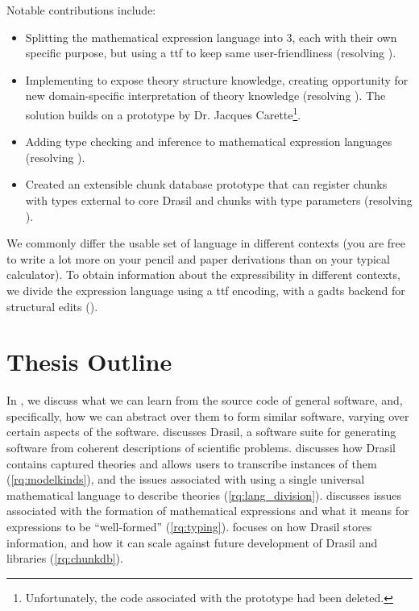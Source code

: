 Notable contributions include:

\begin{itemize}
      
      \item Splitting the mathematical expression language into 3, each with
            their own specific purpose, but using a \acs{ttf} to keep same
            user-friendliness (resolving ).

      \item Implementing \ModelKinds{} to expose theory structure knowledge,
            creating opportunity for new domain-specific interpretation of
            theory knowledge (resolving ). The solution
            builds on a prototype by Dr. Jacques Carette\footnote{Unfortunately,
            the code associated with the prototype had been deleted.}.

      \item Adding type checking and inference to mathematical expression
            languages (resolving ).

      \item Created an extensible chunk database prototype that can register
            chunks with types external to core Drasil and chunks with type
            parameters (resolving ).

\end{itemize}

We commonly differ the usable set of language in different contexts (you are
free to write a lot more on your pencil and paper derivations than on your
typical calculator). To obtain information about the expressibility in different
contexts, we divide the expression language using a \acs{ttf} \cite{Carette2009}
encoding, with a \acsp{gadt} backend for structural edits
().

\section{Thesis Outline}
\label{sec:intro:outline}

In , we discuss what we can learn from the source code of
general software, and, specifically, how we can abstract over them to form
similar software, varying over certain aspects of the software.
 discusses Drasil, a software suite for generating software
from coherent descriptions of scientific problems. 
discusses how Drasil contains captured theories and allows users to transcribe
instances of them (\ref{rq:modelkinds}), and the issues associated with using a
single universal mathematical language to describe theories
(\ref{rq:lang_division}).  discusses issues associated with
the formation of mathematical expressions and what it means for expressions to
be ``well-formed'' (\ref{rq:typing}).  focuses on how
Drasil stores information, and how it can scale against future development of
Drasil and libraries (\ref{rq:chunkdb}).

